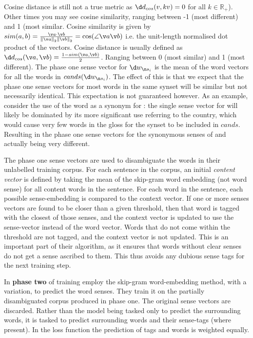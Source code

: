 {{	Cosine distance is still not a true metric as $\d d_{cos}(v,kv)=0$ for all $k\in \mathbb{R}_+$).
	Other times you may see cosine similarity, ranging between -1 (most different) and 1 (most similar.
	Cosine similarity is given by \mbox{$sim(a,b)=\frac{\v a\cdot \v b}{\left\Vert \v a\right\Vert _{2}\left\Vert \v b\right\Vert _{2}}=\cos(\angle \v a \v b )$}
	i.e. the unit-length normalised dot product of the vectors.
	Cosine distance is usually defined as \mbox{$\d d_{cos}(\v a,\v b)=\frac{1-sim(\v a,\v b)}{2}$}.
	Ranging between 0 (most similar) and 1 (most different).
}
The phase one sense vector for $\d w_{\n s_i}$ is the mean of the word vectors for all the words in $cands(\d w_{\n s_{i}})$.
The effect of this is that we expect that the phase one sense vectors for most words in the same synset will be similar but not necessarily identical.
This expectation is not guaranteed however.
As an example, consider the use of the word  as a synonym for : the single sense vector for  will likely be dominated by its more significant use referring to the country, which would cause very few words in the gloss for the  synset to be included in $cands$. Resulting in the phase one sense vectors for the synonymous senses of  and  actually being very different.


The phase one sense vectors are used to disambiguate the words in their unlabelled training corpus.
For each sentence in the corpus, an initial\emph{ content vector} is defined by taking the mean of the skip-gram word embedding (not word sense) for all content words in the sentence.
For each word in the sentence, each possible sense-embedding is compared to the context vector.
If one or more senses vectors are found to be closer than a given threshold,
then that word is tagged with the closest of those senses,
 and the context vector is updated to use the sense-vector instead of the word vector.
Words that do not come within the threshold are not tagged, and the context vector is not updated.
This is an important part of their algorithm, as it ensures that words without clear senses do not get a sense ascribed to them.
This thus avoids any dubious sense tags for the next training step.

In \textbf{phase two} of training
\textcite{Chen2014} employ the skip-gram word-embedding method, with a variation, to predict the word senses.
They train it on the partially disambiguated corpus produced in phase one.
The original sense vectors are discarded.
Rather than the model being tasked only to predict the surrounding words, it is tasked to predict surrounding words and their sense-tags (where present).
In the loss function the prediction of tags and words is weighted equally.

}
